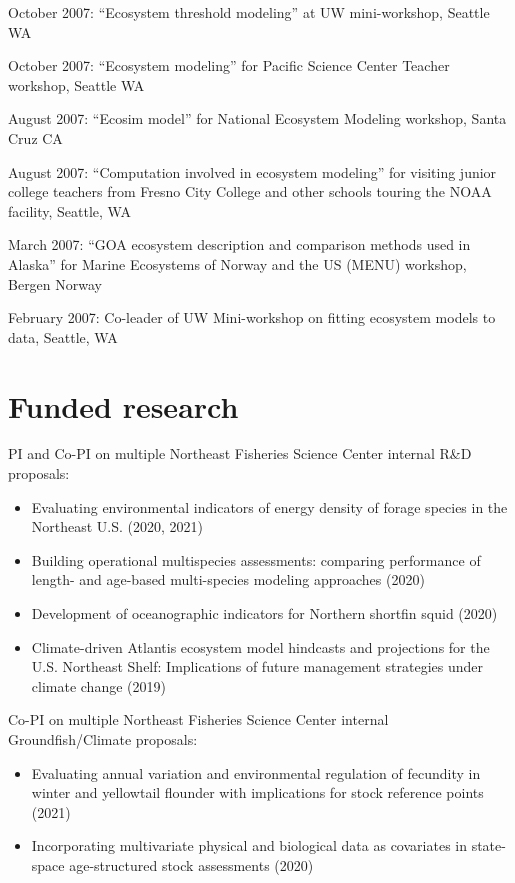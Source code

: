 \documentclass[11pt, a4paper]{awesome-cv}
\begin{document}
October 2007: ``Ecosystem threshold modeling'' at UW mini-workshop,
Seattle WA

October 2007: ``Ecosystem modeling'' for Pacific Science Center Teacher
workshop, Seattle WA

August 2007: ``Ecosim model'' for National Ecosystem Modeling workshop,
Santa Cruz CA

August 2007: ``Computation involved in ecosystem modeling'' for visiting
junior college teachers from Fresno City College and other schools
touring the NOAA facility, Seattle, WA

March 2007: ``GOA ecosystem description and comparison methods used in
Alaska'' for Marine Ecosystems of Norway and the US (MENU) workshop,
Bergen Norway

February 2007: Co-leader of UW Mini-workshop on fitting ecosystem models
to data, Seattle, WA

\hypertarget{funded-research}{%
\section{Funded research}\label{funded-research}}

PI and Co-PI on multiple Northeast Fisheries Science Center internal
R\&D proposals:

\begin{itemize}
\item
  Evaluating environmental indicators of energy density of forage
  species in the Northeast U.S. (2020, 2021)
\item
  Building operational multispecies assessments: comparing performance
  of length- and age-based multi-species modeling approaches (2020)
\item
  Development of oceanographic indicators for Northern shortfin squid
  (2020)
\item
  Climate-driven Atlantis ecosystem model hindcasts and projections for
  the U.S. Northeast Shelf: Implications of future management strategies
  under climate change (2019)
\end{itemize}

Co-PI on multiple Northeast Fisheries Science Center internal
Groundfish/Climate proposals:

\begin{itemize}
\item
  Evaluating annual variation and environmental regulation of fecundity
  in winter and yellowtail flounder with implications for stock
  reference points (2021)
\item
  Incorporating multivariate physical and biological data as covariates
  in state-space age-structured stock assessments (2020)
\end{itemize}
\end{document}
